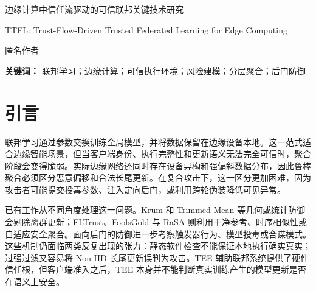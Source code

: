 \documentclass[10pt,a4paper,UTF8,fontset=fandol]{ctexart}
\begin{document}
\begin{center}
    {\Large 边缘计算中信任流驱动的可信联邦关键技术研究\par}
    \vspace{4pt}
    {\large TTFL: Trust-Flow-Driven Trusted Federated Learning for Edge Computing\par}
    \vspace{8pt}
    {匿名作者\par}
\end{center}

\begin{abstract}
    联邦学习（FL）通过避免原始数据迁移来支持边缘智能协同训练，但开放式边缘参与也使聚合过程暴露于不可信执行、模型投毒、隐蔽后门以及严重 Non-IID 偏移等风险之下。现有鲁棒聚合方法往往依赖更严格的阈值来拒绝恶意更新，却容易同时剔除合法的长尾客户端。本文提出一种信任流驱动的可信联邦学习框架，将硬件锚定准入、运行时信任证据、双流信誉演化和风险门控分层聚合联系起来。该方法通过历史性能流和瞬时风险流分离长期效用与短期攻击风险，再利用按层门控、裁剪和幸存者权重重归一化，在抑制投毒更新的同时保留有价值的异构贡献。基于 Flower/PyTorch 的 CIFAR-10 实验包含 20 个准入客户端、6 类混合攻击和 5 次重复运行；结果表明，在 30\% 恶意设置下，该方法达到 92.31\% 的准确率和 10.21\% 的 ASR，永久封禁误杀率接近零。
\end{abstract}

\noindent\textbf{关键词：} 联邦学习；边缘计算；可信执行环境；风险建模；分层聚合；后门防御

\section{引言}

联邦学习通过参数交换训练全局模型，并将数据保留在边缘设备本地\cite{kairouz2021flsurvey,mcmahan2017fedavg}。这一范式适合边缘智能场景，但当客户端身份、执行完整性和更新语义无法完全可信时，聚合阶段会变得脆弱。实际边缘网络还同时存在设备异构和强偏斜数据分布，因此鲁棒聚合必须区分恶意偏移和合法长尾更新。在复合攻击下，这一区分更加困难，因为攻击者可能提交投毒参数、注入定向后门，或利用跨轮伪装降低可见异常。

已有工作从不同角度处理这一问题。Krum 和 Trimmed Mean 等几何或统计防御会剔除离群更新\cite{blanchard2017krum,yin2018byzantine}；FLTrust、FoolsGold 与 RaSA 则利用干净参考、时序相似性或自适应安全聚合\cite{cao2021fltrust,fung2020foolsgold,wang2025rasa}。面向后门的防御进一步考察触发器行为、模型投毒或合谋模式\cite{bagdasaryan2020backdoor,wang2019neuralcleanse,flpurifier,roseagg,shieldfl}。这些机制仍面临两类反复出现的张力：静态软件检查不能保证本地执行确实真实；过强过滤又容易将 Non-IID 长尾更新误判为攻击。TEE 辅助联邦系统提供了硬件信任根\cite{zhang2025rppfl,r1_tee_integrity,r5_tee_mitigating,xu2021distributed,lu2025tmt}，但客户端准入之后，TEE 本身并不能判断真实训练产生的模型更新是否在语义上安全。
\end{document}
